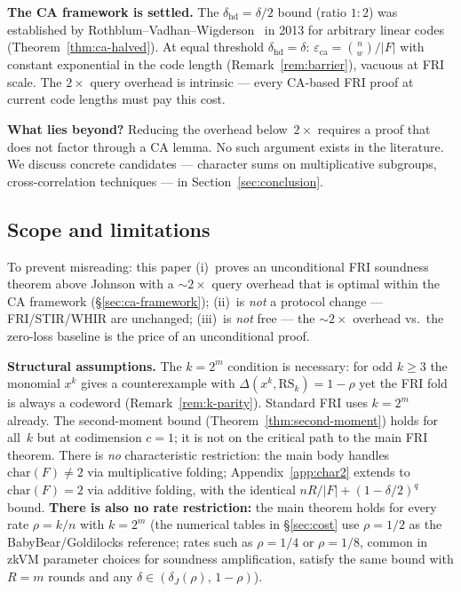 \documentclass[11pt]{article}
\newcommand{\RS}{\mathrm{RS}}
\begin{document}
\textbf{The CA framework is settled.} The $\delta_{\mathrm{hd}} = \delta/2$ bound (ratio $1{:}2$) was established by Rothblum--Vadhan--Wigderson~\cite{RVW} in 2013 for arbitrary linear codes (Theorem~\ref{thm:ca-halved}). At equal threshold $\delta_{\mathrm{hd}} = \delta$: $\varepsilon_{\mathrm{ca}} = \binom{n}{w}/|F|$ with constant exponential in the code length (Remark~\ref{rem:barrier}), vacuous at FRI scale. The $2\times$ query overhead is intrinsic --- every CA-based FRI proof at current code lengths must pay this cost.

\textbf{What lies beyond?} Reducing the overhead below~$2\times$ requires a proof that does not factor through a CA lemma. No such argument exists in the literature. We discuss concrete candidates --- character sums on multiplicative subgroups, cross-correlation techniques --- in Section~\ref{sec:conclusion}.

\subsection{Scope and limitations}
\label{sec:scope}

To prevent misreading: this paper (i)~proves an unconditional FRI soundness theorem above Johnson with a ${\sim}2\times$ query overhead that is optimal within the CA framework (\S\ref{sec:ca-framework}); (ii)~is \emph{not} a protocol change --- FRI/STIR/WHIR are unchanged; (iii)~is \emph{not} free --- the ${\sim}2\times$ overhead vs.\ the zero-loss baseline is the price of an unconditional proof.

\textbf{Structural assumptions.} The $k = 2^m$ condition is necessary: for odd $k \geq 3$ the monomial $x^k$ gives a counterexample with $\Delta(x^k, \RS_k) = 1{-}\rho$ yet the FRI fold is always a codeword (Remark~\ref{rem:k-parity}). Standard FRI uses $k = 2^m$ already. The second-moment bound (Theorem~\ref{thm:second-moment}) holds for all~$k$ but at codimension $c = 1$; it is not on the critical path to the main FRI theorem. There is \emph{no} characteristic restriction: the main body handles $\mathrm{char}(F) \neq 2$ via multiplicative folding; Appendix~\ref{app:char2} extends to $\mathrm{char}(F) = 2$ via additive folding, with the identical $nR/|F| + (1-\delta/2)^q$ bound. \textbf{There is also no rate restriction:} the main theorem holds for every rate $\rho = k/n$ with $k = 2^m$ (the numerical tables in \S\ref{sec:cost} use $\rho = 1/2$ as the BabyBear/Goldilocks reference; rates such as $\rho = 1/4$ or $\rho = 1/8$, common in zkVM parameter choices for soundness amplification, satisfy the same bound with $R = m$ rounds and any $\delta \in (\delta_J(\rho),\, 1{-}\rho)$).
\end{document}
